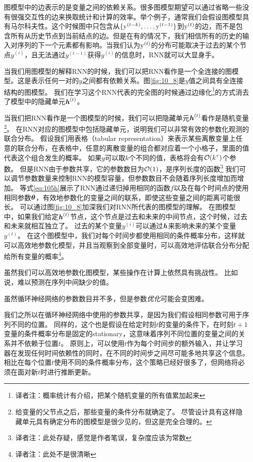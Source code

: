 图模型中的边表示的是变量之间的依赖关系。很多图模型期望可以通过省略一些没有很强交互性的边来换取统计和计算的效率。举个例子，通常我们会假设图模型具有马尔科夫性。这个时候图中只包含从$\{ \mathrm{y}^{(t-k)}, \dots, \mathrm{y}^{(t-1)}\}$到$\mathrm{y}^{(t)}$的边，而不是包含所有从历史节点到当前结点的边。但是在有的情况下，我们相信所有的历史的输入对序列的下一个元素都有影响。当我们认为$\mathrm{y}^{(t)}$的分布可能取决于过去的某个节点$y^{(i)}$，且无法通过$y^{(t-1)}$获得$y^{(i)}$的信息时，RNN就可以大显身手。

当我们用图模型的解释RNN的时候，我们可以把RNN看作是一个全连接的图模型。这是表示任何一对的$y$之间都有依赖关系。图\ref{fig:10_8}是$y$值之间具有全连接结构的图模型。
我们在学习这个RNN代表的完全图的时候通过边缘化\footnote{译者注：概率统计有介绍，把某个随机变量的所有值累加起来}的方式消去了模型中的隐藏单元$\boldsymbol{\mathit{h}}^{(t)}$。

当我们把RNN看作是一个图模型的时候，我们可以把隐藏单元$\boldsymbol{\mathit{h}}^{(t)}$看作是随机变量\footnote{给变量的父节点之后，那些变量的条件分布就确定了。
尽管设计具有这样隐藏单元具有确定分布的图模型是很少见的，但这是完全合理的。}。
在RNN对应的图模型中包括隐藏单元，说明我们可以非常有效的参数化观测的联合分布。
假设我们用表格（tabular representation）来表示某些离散变量上任意的联合分布，在表格中，任意的离散变量的组合都对应着一个小格子，里面的值代表这个组合发生的概率。
如果$y$可以取$k$个不同的值，表格将会有$\mathcal{O}(k^\tau)$个参数。
但是RNN由于参数共享，它的参数数目为$\mathcal{O}(1)$，是序列长度的函数\footnote{译者注：此处存疑，感觉是作者笔误，复杂度应该为常数}
我们可以调节参数数量来控制RNN的模型容量，但参数数目不会随着序列长度增加而增加。
等式\ref{eq:105h}展示了RNN通过递归掉用相同的函数$f$以及在每个时间点的使用相同参数$\boldsymbol{\theta}$，有效地参数化的变量之间的联系，即使这些变量之间的距离可能很长。
可以通过图\ref{fig:10_8}加深我们对RNN所代表的图模型的理解。
在图模型中，如果我们给定$\boldsymbol{\mathit{h}}^{(t)}$节点，这个节点是过去和未来的中间节点，这个时候，过去和未来就相互独立了。
过去的某个变量$y^{(i)}$可以通过$\boldsymbol{\mathit{h}}$来影响未来的某个变量$y^{(t)}$。
在这个图模型中，我们对每个时间步都使用相同的条件概率分布，这样就可以高效地参数化模型，并且当观察到全部变量时，可以高效地评估联合分布分配给所有变量的概率\footnote{译者注：此处不是很清晰}。

虽然我们可以高效地参数化图模型，某些操作在计算上依然具有挑战性。
比如说，难以预测在序列中间缺少的值。

虽然循环神经网络的参数数目并不多，但是参数\emph{优化}可能会变困难。

我们之所以在循环神经网络中使用的参数共享，是因为我们假设相同参数可用于序列不同的位置。
同样的，这个也是假设在给定时刻$t$的变量的条件下，在时刻$t +1$变量的条件概率分布是固定的stationary，这意味着序列不同位置的变量之间的关系并不依赖于位置$t$。
原则上，可以使用$t$作为每个时间步的额外输入，并让学习器在发现任何时间依赖性的同时，在不同的时间步之间尽可能多地共享这个信息。
相比在每个位置$t$使用不同的条件概率分布，这个策略已经好很多了，但网络将必须在面对新$t$时进行推断更新。

